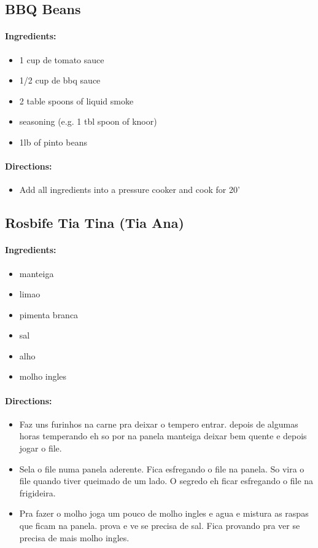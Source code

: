 \documentclass{article}
\begin{document}
\subsection{BBQ Beans}

\paragraph{Ingredients:}

\begin{itemize}
	\item 1 cup de tomato sauce
	\item 1/2 cup de bbq sauce
	\item 2 table spoons of liquid smoke
	\item seasoning (e.g. 1 tbl spoon of knoor)
	\item 1lb of pinto beans
\end{itemize}

\paragraph{Directions:}
\begin{itemize}
	\item Add all ingredients into a pressure cooker and cook for 20'
\end{itemize}

\subsection{Rosbife Tia Tina (Tia Ana)}

\paragraph{Ingredients:}

\begin{itemize}
	\item manteiga
	\item limao
	\item pimenta branca
	\item sal
	\item alho
	\item molho ingles
\end{itemize}

\paragraph{Directions:}
\begin{itemize}
	\item Faz uns furinhos na carne pra deixar o tempero entrar. depois de algumas horas temperando eh so por na panela manteiga deixar bem quente e depois jogar o file.
	\item Sela o file numa panela aderente. Fica esfregando o file na panela. So vira o file quando tiver queimado de um lado. O segredo eh ficar esfregando o file na frigideira.
	\item Pra fazer o molho joga um pouco de molho ingles e agua e mistura as raspas que ficam na panela. prova e ve se precisa de sal. Fica provando pra ver se precisa de mais molho ingles.
\end{itemize}
\end{document}
